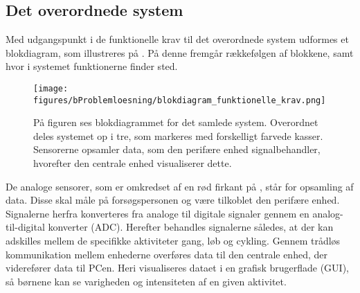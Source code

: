\subsection{Det overordnede system}
Med udgangspunkt i de funktionelle krav til det overordnede system udformes et blokdiagram, som illustreres på . På denne fremgår rækkefølgen af blokkene, samt hvor i systemet funktionerne finder sted.
\begin{figure}[H]
 	\centering
 	\texttt{[image: figures/bProblemloesning/blokdiagram\_funktionelle\_krav.png]}
 	\caption{På figuren ses blokdiagrammet for det samlede system. Overordnet deles systemet op i tre, som markeres med forskelligt farvede kasser. Sensorerne opsamler data, som den perifære enhed signalbehandler, hvorefter den centrale enhed visualiserer dette.} 	
 	\label{fig:blokdiagram}
 \end{figure}\vspace{-0.25cm}
De analoge sensorer, som er omkredset af en rød firkant på , står for opsamling af data. Disse skal måle på forsøgspersonen og være tilkoblet den perifære enhed. Signalerne herfra konverteres fra analoge til digitale signaler gennem en analog-til-digital konverter (ADC). Herefter behandles signalerne således, at der kan adskilles mellem de specifikke aktiviteter gang, løb og cykling. Gennem trådløs kommunikation mellem enhederne overføres data til den centrale enhed, der viderefører data til PCen. Heri visualiseres dataet i en grafisk brugerflade (GUI), så børnene kan se varigheden og intensiteten af en given aktivitet. 